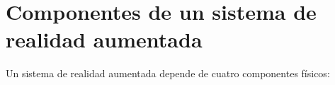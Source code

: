 



\section{Componentes de un sistema de realidad aumentada}
Un sistema de realidad aumentada depende de cuatro componentes físicos:

